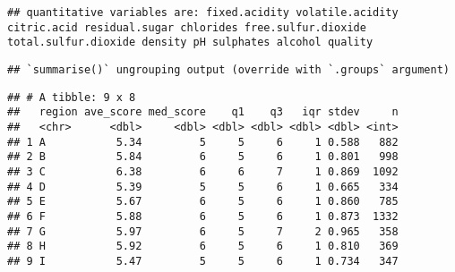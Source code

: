 \documentclass[
]{article}
\newenvironment{Shaded}{\begin{snugshade}}{\end{snugshade}}
\newcommand{\DataTypeTok}[1]{\textcolor[rgb]{0.13,0.29,0.53}{#1}}
\newcommand{\FloatTok}[1]{\textcolor[rgb]{0.00,0.00,0.81}{#1}}
\newcommand{\KeywordTok}[1]{\textcolor[rgb]{0.13,0.29,0.53}{\textbf{#1}}}
\newcommand{\NormalTok}[1]{#1}
\newcommand{\OperatorTok}[1]{\textcolor[rgb]{0.81,0.36,0.00}{\textbf{#1}}}
\newcommand{\OtherTok}[1]{\textcolor[rgb]{0.56,0.35,0.01}{#1}}
\newcommand{\StringTok}[1]{\textcolor[rgb]{0.31,0.60,0.02}{#1}}
\begin{document}
\begin{verbatim}
## quantitative variables are: fixed.acidity volatile.acidity citric.acid residual.sugar chlorides free.sulfur.dioxide total.sulfur.dioxide density pH sulphates alcohol quality
\end{verbatim}

\begin{Shaded}
\end{Shaded}

\begin{verbatim}
## `summarise()` ungrouping output (override with `.groups` argument)
\end{verbatim}

\begin{verbatim}
## # A tibble: 9 x 8
##   region ave_score med_score    q1    q3   iqr stdev     n
##   <chr>      <dbl>     <dbl> <dbl> <dbl> <dbl> <dbl> <int>
## 1 A           5.34         5     5     6     1 0.588   882
## 2 B           5.84         6     5     6     1 0.801   998
## 3 C           6.38         6     6     7     1 0.869  1092
## 4 D           5.39         5     5     6     1 0.665   334
## 5 E           5.67         6     5     6     1 0.860   785
## 6 F           5.88         6     5     6     1 0.873  1332
## 7 G           5.97         6     5     7     2 0.965   358
## 8 H           5.92         6     5     6     1 0.810   369
## 9 I           5.47         5     5     6     1 0.734   347
\end{verbatim}
\end{document}
